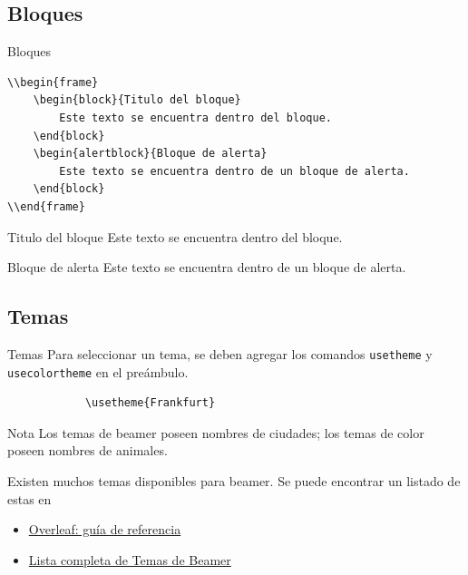 \documentclass[../slides.tex]{subfiles}
\begin{document}
    \subsection{Bloques}
    \begin{frame}[fragile]{Bloques}
        \begin{verbatim}
\\begin{frame}
    \begin{block}{Titulo del bloque}
        Este texto se encuentra dentro del bloque.
    \end{block}
    \begin{alertblock}{Bloque de alerta}
        Este texto se encuentra dentro de un bloque de alerta.
    \end{block}
\\end{frame}
        \end{verbatim}
        \begin{block}{Titulo del bloque}
            Este texto se encuentra dentro del bloque.
        \end{block}
        \begin{alertblock}{Bloque de alerta}
            Este texto se encuentra dentro de un bloque de alerta.
        \end{alertblock}
    \end{frame}
    
    \subsection{Temas}
    \begin{frame}[fragile]{Temas}
        Para seleccionar un tema, se deben agregar los comandos \texttt{usetheme} y \texttt{usecolortheme} en el preámbulo.
        \begin{verbatim}
        	\usetheme{Frankfurt}
        \end{verbatim}
        
        \begin{block}{Nota}
        	Los temas de beamer poseen nombres de ciudades; los temas de color poseen nombres de animales.
        \end{block}

        Existen muchos temas disponibles para beamer. Se puede encontrar un listado de estas en
            \begin{itemize}
            	\item \href{https://www.overleaf.com/learn/latex/Beamer%23Creating_a_table_of_contents#Reference_guide}{Overleaf: guía de referencia}
            	\item \href{https://latex-beamer.com/tutorials/beamer-themes/}{Lista completa de Temas de Beamer}
            \end{itemize}

    \end{frame}
    
\end{document}
